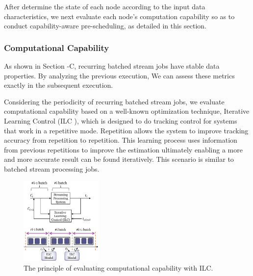 \documentclass[10pt,conference,compsocconf,letterpaper]{IEEEtran}
\begin{document}
  After determine the state of each node according to the input data characteristics, we next evaluate each node's computation capability so as to conduct capability-aware pre-scheduling, as detailed in this section.

\subsubsection{Computational Capability}

  As shown in Section \uppercase\expandafter{}-C, recurring batched stream jobs have stable data properties. By analyzing the previous execution, We can assess these metrics exactly in the subsequent execution.

  Considering the periodicity of recurring batched stream jobs, we evaluate computational capability based on a well-known optimization technique, Iterative Learning Control (ILC \cite{Arimoto}), which is designed to do tracking control for systems that work in a repetitive mode. Repetition allows the system to improve tracking accuracy from repetition to repetition. This learning process uses information from previous repetitions to improve the estimation ultimately enabling a more and more accurate result can be found iteratively. This scenario is similar to batched stream processing jobs.
  \begin{figure}[htbp]
    \centering
    \includegraphics[width=0.36\textwidth]{FigureILC}
    \caption{The principle of evaluating computational capability with ILC.}
    \label{Fig. 8:}
  \end{figure}
\end{document}
